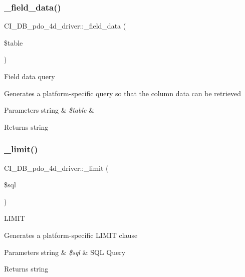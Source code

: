 \subsubsection{\texorpdfstring{\+\_\+field\+\_\+data()}{\_field\_data()}}
{\footnotesize\ttfamily C\+I\+\_\+\+D\+B\+\_\+pdo\+\_\+4d\+\_\+driver\+::\+\_\+field\+\_\+data (\begin{DoxyParamCaption}\item[{}]{\$table }\end{DoxyParamCaption})\hspace{0.3cm}{\ttfamily [protected]}}

Field data query

Generates a platform-\/specific query so that the column data can be retrieved


\begin{DoxyParams}[1]{Parameters}
string & {\em \$table} & \\
\hline
\end{DoxyParams}
\begin{DoxyReturn}{Returns}
string 
\end{DoxyReturn}
\mbox{\label{class_c_i___d_b__pdo__4d__driver_a6e8d1d31e5142de908d60a0ca2489f88}} 
\subsubsection{\texorpdfstring{\+\_\+limit()}{\_limit()}}
{\footnotesize\ttfamily C\+I\+\_\+\+D\+B\+\_\+pdo\+\_\+4d\+\_\+driver\+::\+\_\+limit (\begin{DoxyParamCaption}\item[{}]{\$sql }\end{DoxyParamCaption})\hspace{0.3cm}{\ttfamily [protected]}}

L\+I\+M\+IT

Generates a platform-\/specific L\+I\+M\+IT clause


\begin{DoxyParams}[1]{Parameters}
string & {\em \$sql} & S\+QL Query \\
\hline
\end{DoxyParams}
\begin{DoxyReturn}{Returns}
string 
\end{DoxyReturn}
\mbox{\label{class_c_i___d_b__pdo__4d__driver_a3bbed30c53aee81f9682f456d6747e25}} 
